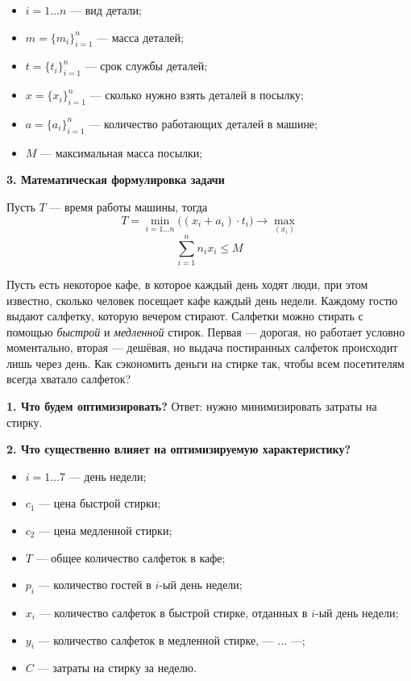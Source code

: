 \begin{itemize}
	\item $i = 1 \dots n$ --- вид детали;
	
	\item $m = \{m_i\}_{i=1}^n$ --- масса деталей;
	
	\item $t = \{t_i\}_{i=1}^n$ --- срок службы деталей;
	
	\item $x = \{x_i\}_{i=1}^n$ --- сколько нужно взять деталей в посылку;
	
	\item $a = \{a_i\}_{i=1}^n$ --- количество работающих деталей в машине;
	
	\item $M$ --- максимальная масса посылки;
\end{itemize}

\textbf{3. Математическая формулировка задачи}

Пусть $T$ --- время работы машины, тогда
\[
T = \min_{i = 1 \dots n} \big((x_i + a_i) \cdot t_i\big) \to \max_{(x_i)}
\]
\[
\sum_{i=1}^{n} n_i x_i \le M
\]

\problem[о салфетках]

Пусть есть некоторое кафе, в которое каждый день ходят люди, при этом известно, сколько человек посещает кафе каждый день недели. Каждому гостю выдают салфетку, которую вечером стирают. Салфетки можно стирать с помощью \textit{быстрой} и \textit{медленной} стирок. Первая --- дорогая, но работает условно моментально, вторая --- дешёвая, но выдача постиранных салфеток происходит лишь через день. Как сэкономить деньги на стирке так, чтобы всем посетителям всегда хватало салфеток?

\textbf{1. Что будем оптимизировать?} Ответ: нужно минимизировать затраты на стирку.

\textbf{2. Что существенно влияет на оптимизируемую характеристику?}

\begin{itemize}[nosep]
	\item $i = 1 \dots 7$ --- день недели;
	
	\item $c_1$ --- цена быстрой стирки;
	
	\item $c_2$ --- цена медленной стирки;
	
	\item $T$ --- общее количество салфеток в кафе;
	
	\item $p_i$ --- количество гостей в $i$-ый день недели;
	
	\item $x_i$ --- количество салфеток в быстрой стирке, отданных в $i$-ый день недели;
	
	\item $y_i$ --- количество салфеток в медленной стирке, --- $\dots$ ---;
	
	\item $C$ --- затраты на стирку за неделю.
\end{itemize}

